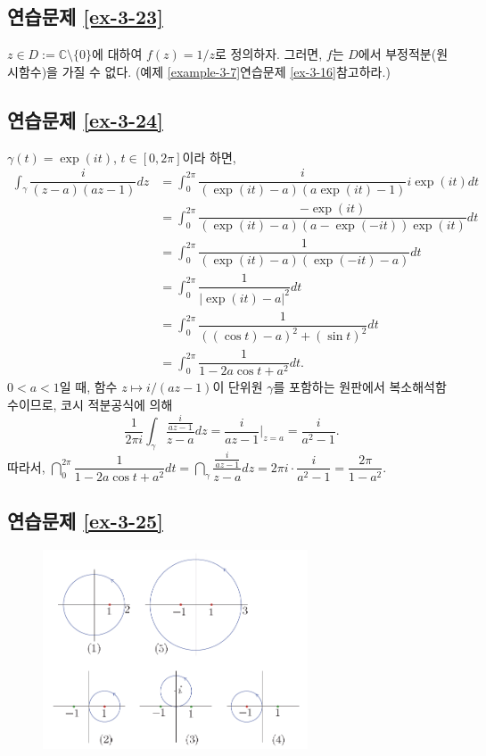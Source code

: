 \subsection*{연습문제 \ref{ex-3-23}}

$z\in D:= \mathbb C\setminus\{0\}$에 대하여 $f(z) = 1/z$로 정의하자.
그러면, $f$는 $D$에서 부정적분(원시함수)을 가질 수 없다.
(예제 \ref{example-3-7}\과 연습문제 \ref{ex-3-16}\을 참고하라.)

\subsection*{연습문제 \ref{ex-3-24}}

$\gamma(t) = \exp(it)$, $t\in[0,2\pi]$이라 하면,
\begin{align*}
\int_\gamma \dfrac i{(z-a)(az-1)}dz 
&= \int_0^{2\pi} \dfrac{i}{(\exp(it) -a)(a\exp(it)-1)}i\exp(it)dt \\
&= \int_0^{2\pi} \dfrac{-\exp(it)}{(\exp(it) -a)(a-\exp(-it))\exp(it)}dt \\
&= \int_0^{2\pi} \dfrac{1}{(\exp(it) -a)(\exp(-it)-a)}dt \\
&= \int_0^{2\pi} \dfrac1{|\exp(it)-a|^2}dt \\
&= \int_0^{2\pi} \dfrac1{((\cos t)-a)^2 + (\sin t)^2}dt \\
&= \int_0^{2\pi} \dfrac1{1-2a\cos t + a^2}dt.
\end{align*}
$0<a<1$일 때,
함수 $z\mapsto i/(az-1)$이 단위원 $\gamma$를 포함하는 원판에서 복소해석함수이므로,
코시 적분공식에 의해
\[
\dfrac1{2\pi i} \int_\gamma \dfrac{\frac{i}{az-1}}{z-a}dz = \dfrac{i}{az-1}\Big|_{z=a}
= \dfrac i{a^2-1}.
\]
따라서,
$\dint_0^{2\pi} \dfrac 1{1-2a\cos t +a^2}dt
= \dint_\gamma \dfrac{\frac{i}{az-1}}{z-a}dz 
= 2\pi i \cdot \dfrac i{a^2-1} = \dfrac{2\pi}{1-a^2}$.

\subsection*{연습문제 \ref{ex-3-25}}

\begin{figure}[h!]
\begin{center}
\includegraphics[width=0.7\textwidth]{./Solution/figs/fig-s-0-11}
\end{center}
\end{figure}

